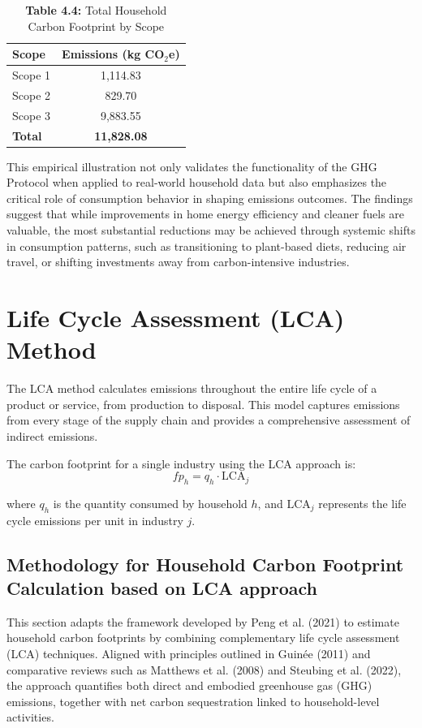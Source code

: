 \documentclass[12pt,a4paper]{article}%
\begin{document}
\begin{table}[h]
\centering
\caption*{\textbf{Table 4.4:} Total Household Carbon Footprint by Scope}\label{tab:total_emissions}
\begin{tabular}{lc}
\toprule
\textbf{Scope} & \textbf{Emissions (kg CO$_2$e)} \\
\midrule
Scope 1 & 1,114.83 \\
Scope 2 &   829.70 \\
Scope 3 & 9,883.55 \\
\midrule
\textbf{Total} & \textbf{11,828.08} \\
\bottomrule
\end{tabular}
\end{table}


This empirical illustration not only validates the functionality of the GHG Protocol when applied to real-world household data but also emphasizes the critical role of consumption behavior in shaping emissions outcomes. The findings suggest that while improvements in home energy efficiency and cleaner fuels are valuable, the most substantial reductions may be achieved through systemic shifts in consumption patterns, such as transitioning to plant-based diets, reducing air travel, or shifting investments away from carbon-intensive industries.
\section{Life Cycle Assessment (LCA) Method}
The LCA method calculates emissions throughout the entire life cycle of a product or service, from production to disposal. This model captures emissions from every stage of the supply chain and provides a comprehensive assessment of indirect emissions.

The carbon footprint for a single industry using the LCA approach is:
\begin{equation}
   fp_h = q_h \cdot \text{LCA}_j 
\end{equation}

where \(q_h\) is the quantity consumed by household \(h\), and \(\text{LCA}_j\) represents the life cycle emissions per unit in industry \(j\).


\subsection{Methodology for Household Carbon Footprint Calculation based on LCA approach}
This section adapts the framework developed by Peng et al. (2021) to estimate household carbon footprints by combining complementary life cycle assessment (LCA) techniques. Aligned with principles outlined in Guinée (2011) and comparative reviews such as Matthews et al. (2008) and Steubing et al. (2022), the approach quantifies both direct and embodied greenhouse gas (GHG) emissions, together with net carbon sequestration linked to household-level activities.
\end{document}
